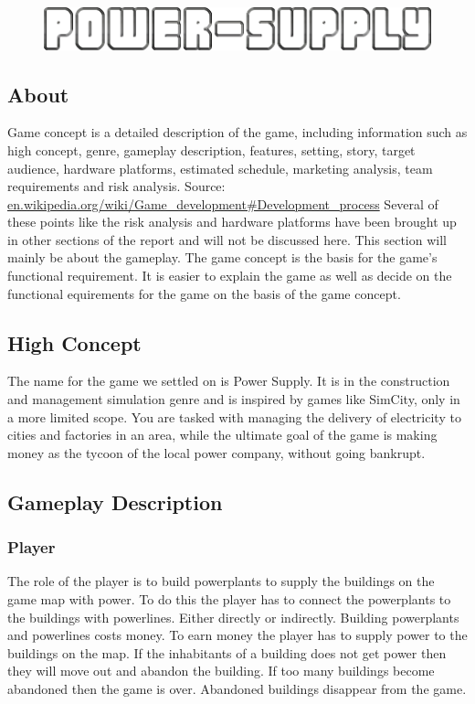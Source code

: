 \begin{figure}[H]
	\includegraphics[scale=0.40]{pictures/logo2.png}
\end{figure}

\subsection{About}
Game concept is a detailed description of the game, including information such as high concept, genre,
gameplay description, features, setting, story, target audience, hardware platforms, estimated schedule,
marketing analysis, team requirements and risk analysis. Source: 
\url{en.wikipedia.org/wiki/Game_development#Development_process}
Several of these points like the risk analysis and hardware platforms have been brought up in other 
sections of the report and will not be discussed here. This section will mainly be about the gameplay. 
The game concept is the basis for the game's functional requirement. It is easier to explain the game 
as well as decide on the functional equirements for the game on the basis of the game concept. 

\subsection{High Concept}
The name for the game we settled on is Power Supply. It is in the construction and management 
simulation genre and is inspired by games like SimCity, only in a more limited scope. You are 
tasked with managing the delivery of electricity to cities and factories in an area, while the 
ultimate goal of the game is making money as the tycoon of the local power company, without going 
bankrupt.

\subsection{Gameplay Description}

\subsubsection*{Player}
The role of the player is to build powerplants to supply the buildings on the game map with power. 
To do this the player has to connect the powerplants to the buildings with powerlines. Either directly
or indirectly. Building powerplants and powerlines costs money. To earn money the player has to supply
power to the buildings on the map. If the inhabitants of a building does not get power then they will
move out and abandon the building. If too many buildings become abandoned then the game is over.
Abandoned buildings disappear from the game.

